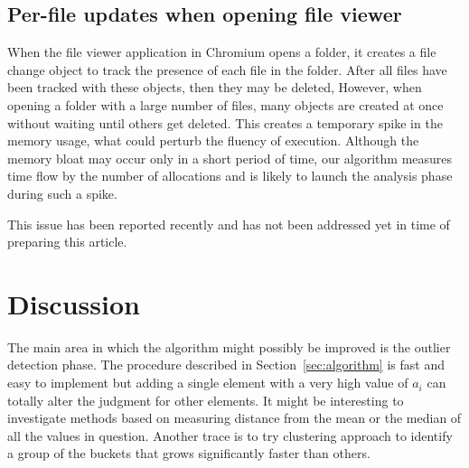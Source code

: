 \documentclass[preprint, numbers]{sigplanconf}
\begin{document}
\subsection{Per-file updates when opening file viewer \cite{bug-files}}

When the file viewer application in Chromium opens a folder, it creates a file change object to track the presence of each file in the folder.
After all files have been tracked with these objects, then they may be deleted,
However, when opening a folder with a large number of files, many objects are created at once
without waiting until others get deleted.
This creates a temporary spike in the memory usage, what could perturb the fluency of execution.
Although the memory bloat may occur only in a short period of time,
our algorithm measures time flow by the number of allocations and
is likely to launch the analysis phase during such a spike.

This issue has been reported recently and has not been addressed yet in time of preparing this article.

\section{Discussion}

The main area in which the algorithm might possibly be improved is
the outlier detection phase.
The procedure described in Section~\ref{sec:algorithm} is fast and easy to implement
but adding a single element with a very high value of $a_i$ can totally alter the judgment
for other elements.
It might be interesting to investigate methods based on measuring distance from the mean or the median
of all the values in question.
Another trace is to try clustering approach to identify a group of the buckets that grows
significantly faster than others.






\end{document}
